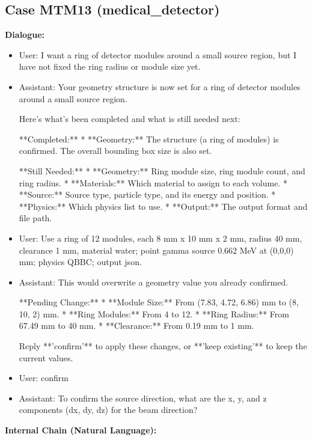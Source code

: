 \documentclass[11pt]{ctexart}
\begin{document}
\subsection{Case MTM13 (medical\_detector)}
\textbf{Dialogue:}
\begin{itemize}
\item User: I want a ring of detector modules around a small source region, but I have not fixed the ring radius or module size yet.
\item Assistant: Your geometry structure is now set for a ring of detector modules around a small source region.

Here’s what’s been completed and what is still needed next:

**Completed:**
*   **Geometry:** The structure (a ring of modules) is confirmed. The overall bounding box size is also set.

**Still Needed:**
*   **Geometry:** Ring module size, ring module count, and ring radius.
*   **Materials:** Which material to assign to each volume.
*   **Source:** Source type, particle type, and its energy and position.
*   **Physics:** Which physics list to use.
*   **Output:** The output format and file path.
\item User: Use a ring of 12 modules, each 8 mm x 10 mm x 2 mm, radius 40 mm, clearance 1 mm, material water; point gamma source 0.662 MeV at (0,0,0) mm; physics QBBC; output json.
\item Assistant: This would overwrite a geometry value you already confirmed.

**Pending Change:**
*   **Module Size:** From (7.83, 4.72, 6.86) mm to (8, 10, 2) mm.
*   **Ring Modules:** From 4 to 12.
*   **Ring Radius:** From 67.49 mm to 40 mm.
*   **Clearance:** From 0.19 mm to 1 mm.

Reply **'confirm'** to apply these changes, or **'keep existing'** to keep the current values.
\item User: confirm
\item Assistant: To confirm the source direction, what are the x, y, and z components (dx, dy, dz) for the beam direction?
\end{itemize}
\textbf{Internal Chain (Natural Language):}
\end{document}
